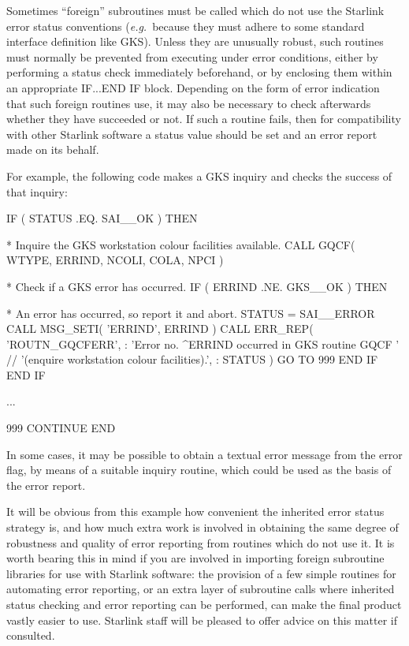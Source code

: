 \documentclass[twoside,11pt]{starlink}
\begin{document}
Sometimes ``foreign'' subroutines must be called which do not use the
Starlink error status conventions (\textit{e.g.}\ because they must adhere to some
standard interface definition like GKS).
Unless they are unusually robust, such routines must normally be prevented
from executing under error conditions, either by performing a status check
immediately beforehand, or by enclosing them within an appropriate IF...END
IF block.
Depending on the form of error indication that such foreign routines use, it
may also be necessary to check afterwards whether they have succeeded or
not.
If such a routine fails, then for compatibility with other Starlink
software a status value should be set and an error report made on its
behalf.

For example, the following code makes a GKS inquiry and checks the
success of that inquiry:

\begin {small}
\begin{terminalv}
      IF ( STATUS .EQ. SAI__OK ) THEN

*     Inquire the GKS workstation colour facilities available.
         CALL GQCF( WTYPE, ERRIND, NCOLI, COLA, NPCI )

*     Check if a GKS error has occurred.
         IF ( ERRIND .NE. GKS__OK ) THEN

*        An error has occurred, so report it and abort.
            STATUS = SAI__ERROR
            CALL MSG_SETI( 'ERRIND', ERRIND )
            CALL ERR_REP( 'ROUTN_GQCFERR',
     :              'Error no. ^ERRIND occurred in GKS routine GQCF ' //
                    '(enquire workstation colour facilities).',
     :              STATUS )
            GO TO 999
         END IF
      END IF

      ...

 999  CONTINUE
      END
\end{terminalv}
\end {small}

In some cases, it may be possible to obtain a textual error message from the
error flag, by means of a suitable inquiry routine, which could be used as
the basis of the error report.

It will be obvious from this example how convenient the inherited error
status strategy is, and how much extra work is involved in obtaining the
same degree of robustness and quality of error reporting from routines
which do not use it.
It is worth bearing this in mind if you are involved in importing foreign
subroutine libraries for use with Starlink software: the provision of a few
simple routines for automating error reporting, or an extra layer of
subroutine calls where inherited status checking and error reporting can be
performed, can make the final product vastly easier to use.
Starlink staff will be pleased to offer advice on this matter if consulted.
\end{document}
